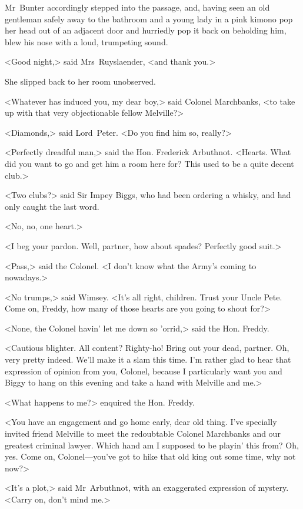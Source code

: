 Mr~Bunter accordingly stepped into the passage, and, having seen an old gentleman safely away to the bathroom and a young lady in a pink kimono pop her head out of an adjacent door and hurriedly pop it back on beholding him, blew his nose with a loud, trumpeting sound.

<Good night,> said Mrs~Ruyslaender, <and thank you.>

She slipped back to her room unobserved.

<Whatever has induced you, my dear boy,> said Colonel Marchbanks, <to take up with that very objectionable fellow Melville?>

<Diamonds,> said Lord~Peter. <Do you find him so, really?>

<Perfectly dreadful man,> said the Hon. Frederick Arbuthnot. <Hearts. What did you want to go and get him a room here for? This used to be a quite decent club.>

<Two clubs?> said Sir Impey Biggs, who had been ordering a whisky, and had only caught the last word.

<No, no, one heart.>

<I beg your pardon. Well, partner, how about spades? Perfectly good suit.>

<Pass,> said the Colonel. <I don't know what the Army's coming to nowadays.>

<No trumps,> said Wimsey. <It's all right, children. Trust your Uncle Pete. Come on, Freddy, how many of those hearts are you going to shout for?>

<None, the Colonel havin' let me down so 'orrid,> said the Hon. Freddy.

<Cautious blighter. All content? Righty-ho! Bring out your dead, partner. Oh, very pretty indeed. We'll make it a slam this time. I'm rather glad to hear that expression of opinion from you, Colonel, because I particularly want you and Biggy to hang on this evening and take a hand with Melville and me.>

<What happens to me?> enquired the Hon. Freddy.

<You have an engagement and go home early, dear old thing. I've specially invited friend Melville to meet the redoubtable Colonel Marchbanks and our greatest criminal lawyer. Which hand am I supposed to be playin' this from? Oh, yes. Come on, Colonel—you've got to hike that old king out some time, why not now?>

<It's a plot,> said Mr~Arbuthnot, with an exaggerated expression of mystery. <Carry on, don't mind me.>

